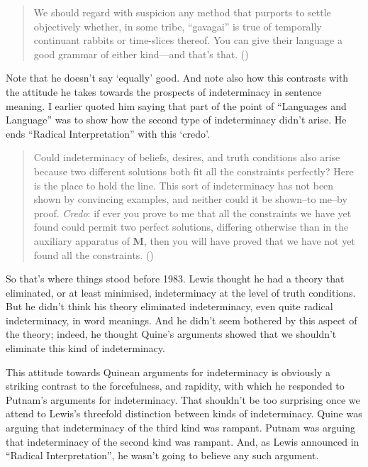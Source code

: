 \documentclass[
  11pt,
  letterpaper,
  DIV=11,
  numbers=noendperiod,
  twoside]{scrartcl}
\begin{document}
\begin{quote}
We should regard with suspicion any method that purports to settle
objectively whether, in some tribe, ``gavagai'' is true of temporally
continuant rabbits or time-slices thereof. You can give their language a
good grammar of either kind---and that's that.
()
\end{quote}

Note that he doesn't say `equally' good. And note also how this
contrasts with the attitude he takes towards the prospects of
indeterminacy in sentence meaning. I earlier quoted him saying that part
of the point of ``Languages and Language'' was to show how the second
type of indeterminacy didn't arise. He ends ``Radical Interpretation''
with this `credo'.

\begin{quote}
Could indeterminacy of beliefs, desires, and truth conditions also arise
because two different solutions both fit all the constraints perfectly?
Here is the place to hold the line. This sort of indeterminacy has not
been shown by convincing examples, and neither could it be shown--to
me--by proof. \emph{Credo}: if ever you prove to me that all the
constraints we have yet found could permit two perfect solutions,
differing otherwise than in the auxiliary apparatus of \textbf{M}, then
you will have proved that we have not yet found all the constraints.
()
\end{quote}

So that's where things stood before 1983. Lewis thought he had a theory
that eliminated, or at least minimised, indeterminacy at the level of
truth conditions. But he didn't think his theory eliminated
indeterminacy, even quite radical indeterminacy, in word meanings. And
he didn't seem bothered by this aspect of the theory; indeed, he thought
Quine's arguments showed that we shouldn't eliminate this kind of
indeterminacy.

This attitude towards Quinean arguments for indeterminacy is obviously a
striking contrast to the forcefulness, and rapidity, with which he
responded to Putnam's arguments for indeterminacy. That shouldn't be too
surprising once we attend to Lewis's threefold distinction between kinds
of indeterminacy. Quine was arguing that indeterminacy of the third kind
was rampant. Putnam was arguing that indeterminacy of the second kind
was rampant. And, as Lewis announced in ``Radical Interpretation'', he
wasn't going to believe any such argument.
\end{document}
